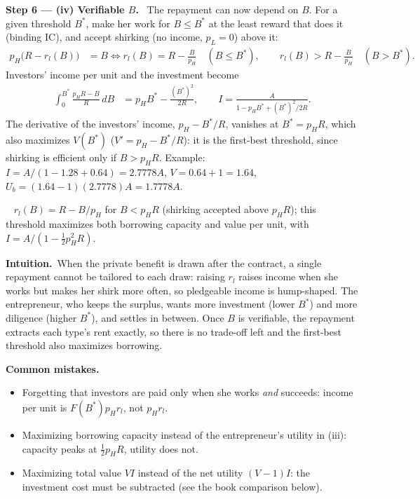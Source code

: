 \documentclass[11pt,a4paper]{article}
\newcommand{\step}[2]{\par\medskip\noindent\textbf{Step #1 --- #2.}~}
\newcommand{\intuition}{\par\medskip\noindent\textbf{Intuition.}~}
\newcommand{\answer}[1]{\par\smallskip\noindent\fbox{\textbf{Answer #1.}}~}
\newcommand{\pitfalls}{\par\medskip\noindent\textbf{Common mistakes.}}
\begin{document}
\step{6}{(iv) Verifiable $B$} The repayment can now depend on $B$. For a given threshold $B^*$, make her work for $B\le B^*$ at the least reward that does it (binding IC), and accept shirking (no income, $p_L=0$) above it:
\begin{align}
  p_H\bigl(R-r_l(B)\bigr) &= B \iff r_l(B) = R-\frac{B}{p_H} \quad (B\le B^*), \qquad r_l(B) > R-\frac{B}{p_H} \quad (B>B^*). \nonumber
\end{align}
Investors' income per unit and the investment become
\begin{align}
  \int_0^{B^*}\frac{p_HR-B}{R}\,dB &= p_HB^* - \frac{(B^*)^2}{2R}, \qquad I = \frac{A}{1-p_HB^*+(B^*)^2/2R}. \label{r7e12-iv}
\end{align}
The derivative of the investors' income, $p_H-B^*/R$, vanishes at $B^*=p_HR$, which also maximizes $V(B^*)$ ($V'=p_H-B^*/R$): it is the first-best threshold, since shirking is efficient only if $B>p_HR$. Example: $I=A/(1-1.28+0.64)=2.7778A$, $V=0.64+1=1.64$, $U_b=(1.64-1)(2.7778)A=1.7778A$.
\answer{(iv)} $r_l(B)=R-B/p_H$ for $B<p_HR$ (shirking accepted above $p_HR$); this threshold maximizes both borrowing capacity and value per unit, with $I=A/(1-\tfrac12p_H^2R)$.

\intuition When the private benefit is drawn after the contract, a single repayment cannot be tailored to each draw: raising $r_l$ raises income when she works but makes her shirk more often, so pledgeable income is hump-shaped. The entrepreneur, who keeps the surplus, wants more investment (lower $B^*$) and more diligence (higher $B^*$), and settles in between. Once $B$ is verifiable, the repayment extracts each type's rent exactly, so there is no trade-off left and the first-best threshold also maximizes borrowing.

\pitfalls
\begin{itemize}
  \item Forgetting that investors are paid only when she works \emph{and} succeeds: income per unit is $F(B^*)p_Hr_l$, not $p_Hr_l$.
  \item Maximizing borrowing capacity instead of the entrepreneur's utility in (iii): capacity peaks at $\tfrac12p_HR$, utility does not.
  \item Maximizing total value $VI$ instead of the net utility $(V-1)I$: the investment cost must be subtracted (see the book comparison below).
\end{itemize}
\end{document}
